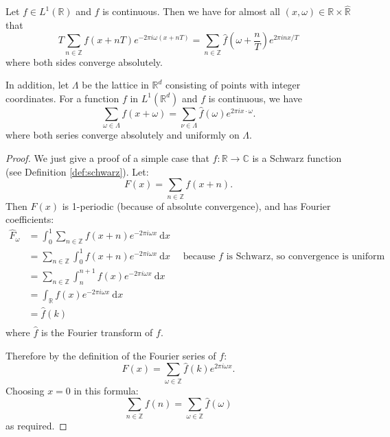 
\begin{theorem}
Let $f \in L^{1}(\mathbb{R})$ and $f$ is continuous. Then we have for almost all $(x, \omega ) \in \mathbb{R} \times \hat{\mathbb{R}}$ that
$$
T \sum_{n \in \mathbb{Z}} f(x+n T) e^{-2 \pi i \omega (x+n T)}=\sum_{n \in \mathbb{Z}} \hat{f}\left(\omega +\frac{n}{T}\right) e^{2 \pi i n x / T}
$$
where both sides converge absolutely.

In addition,  let $\Lambda$ be the lattice in $\mathbb{R}^{d}$ consisting of points with integer coordinates. 
For a function $f$ in $L^{1}\left(\mathbb{R}^{d}\right)$ and $f$ is continuous, we have 
$$
\sum_{\omega  \in \Lambda} f(x+\omega )=\sum_{\nu \in \Lambda} \hat{f}(\omega ) e^{2 \pi i x \cdot \omega }.
$$
where both series converge absolutely and uniformly on $\Lambda$. 
\end{theorem} 

\begin{proof}
We just give a proof of a simple case that $f: \mathbb{R} \rightarrow \mathbb{C}$ is a Schwarz function (see Definition \ref{def:schwarz}).
Let:
$$
F(x)=\sum_{n \in \mathbb{Z}} f(x+n).
$$
Then $F(x)$ is 1-periodic (because of absolute convergence), and has Fourier coefficients:
$$
\begin{aligned}
\hat{F}_{\omega } &=\int_{0}^{1} \sum_{n \in \mathbb{Z}} f(x+n) e^{-2 \pi i \omega x} \mathrm{~d} x \\
&=\sum_{n \in \mathbb{Z}} \int_{0}^{1} f(x+n) e^{-2 \pi i \omega  x} \mathrm{~d} x \quad \text { because } f \text { is Schwarz, so convergence is uniform}\\
&=\sum_{n \in \mathbb{Z}} \int_{n}^{n+1} f(x) e^{-2 \pi i\omega  x} \mathrm{~d} x \\
&=\int_{\mathbb{R}} f(x) e^{-2 \pi i \omega  x} \mathrm{~d} x\\
&=\hat{f}(k)\\
\end{aligned}
$$
 where $\hat{f}$ is the Fourier transform of $f$.
 

Therefore by the definition of the Fourier series of $f:$
$$
F(x) =\sum_{\omega  \in \mathbb{Z}} \hat{f}(k) e^{2\pi i \omega x}.
$$
Choosing $x=0$ in this formula:
$$
\sum_{n \in \mathbb{Z}} f(n)=\sum_{\omega  \in \mathbb{Z}} \hat{f}(\omega )
$$
as required.
\end{proof}





